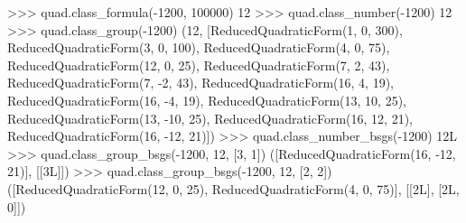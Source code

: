 %
%
%
\begin{ex}
>>> quad.class_formula(-1200, 100000)
12
>>> quad.class_number(-1200)
12
>>> quad.class_group(-1200)
(12, [ReducedQuadraticForm(1, 0, 300), ReducedQuadraticForm(3, 0, 100), 
ReducedQuadraticForm(4, 0, 75), ReducedQuadraticForm(12, 0, 25), 
ReducedQuadraticForm(7, 2, 43), ReducedQuadraticForm(7, -2, 43), 
ReducedQuadraticForm(16, 4, 19), ReducedQuadraticForm(16, -4, 19), 
ReducedQuadraticForm(13, 10, 25), ReducedQuadraticForm(13, -10, 25), 
ReducedQuadraticForm(16, 12, 21), ReducedQuadraticForm(16, -12, 21)])
>>> quad.class_number_bsgs(-1200)
12L
>>> quad.class_group_bsgs(-1200, 12, [3, 1])
([ReducedQuadraticForm(16, -12, 21)], [[3L]])
>>> quad.class_group_bsgs(-1200, 12, [2, 2])
([ReducedQuadraticForm(12, 0, 25), ReducedQuadraticForm(4, 0, 75)], 
[[2L], [2L, 0]])
\end{ex}%
\C



